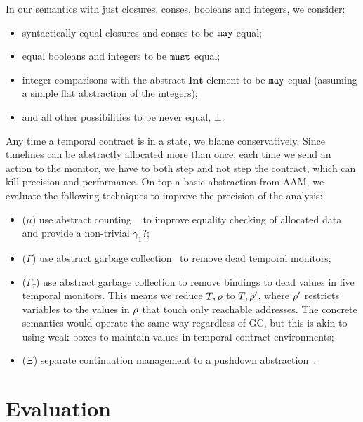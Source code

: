 %
In our semantics with just closures, conses, booleans and integers, we consider:
\begin{itemize}
 \item syntactically equal closures and conses to be ${\tt may}$ equal;
 \item equal booleans and integers to be ${\tt must}$ equal;
 \item integer comparisons with the abstract $\mathbf{Int}$ element to be ${\tt may}$ equal (assuming a simple flat abstraction of the integers);
 \item and all other possibilities to be never equal, $\bot$.
\end{itemize}
%
Any time a temporal contract is in a \may{} state, we blame conservatively.
%
Since timelines can be abstractly allocated more than once, each time we send an action to the monitor, we have to both step and not step the contract, which can kill precision and performance.
%
On top a basic abstraction from AAM, we evaluate the following techniques to improve the precision of the analysis:
\begin{itemize}
\item{($\mu$) use abstract counting ~\citep{dvanhorn:Might:2006:GammaCFA} to improve equality checking of allocated data and provide a non-trivial $\gamma_1?$;}
\item{($\Gamma$) use abstract garbage collection~\citep{dvanhorn:Might:2006:GammaCFA} to remove dead temporal monitors;}
\item{($\Gamma_\tau$) use abstract garbage collection to remove bindings to dead values in live temporal monitors.
%
This means we reduce $T,\rho$ to $T,\rho'$, where $\rho'$ restricts variables to the values in $\rho$ that touch only reachable addresses.
%
The concrete semantics would operate the same way regardless of GC, but this is akin to using weak boxes to maintain values in temporal contract environments;}
\item{($\Xi$) separate continuation management to a pushdown abstraction~\citep{dvanhorn:Vardoulakis2011CFA2}.}%
\end{itemize}

\section{Evaluation}\label{sec:evaluation}


